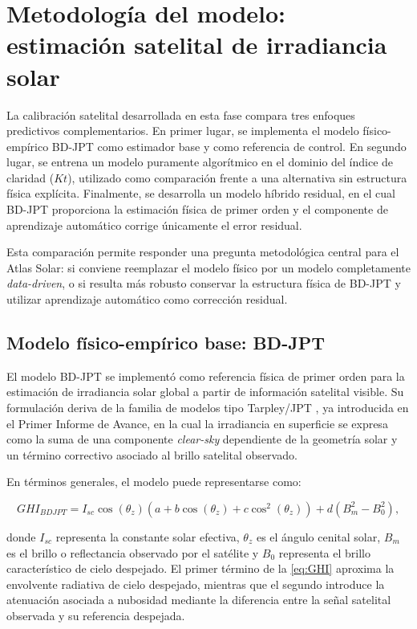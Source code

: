 \documentclass[../main.tex]{subfiles}
\begin{document}
\section{Metodología del modelo: estimación satelital de irradiancia solar}

La calibración satelital desarrollada en esta fase compara tres enfoques predictivos complementarios. En primer lugar, se implementa el modelo físico-empírico BD-JPT como estimador base y como referencia de control. En segundo lugar, se entrena un modelo puramente algorítmico en el dominio del índice de claridad ($Kt$), utilizado como comparación frente a una alternativa sin estructura física explícita. Finalmente, se desarrolla un modelo híbrido residual, en el cual BD-JPT proporciona la estimación física de primer orden y el componente de aprendizaje automático corrige únicamente el error residual.

Esta comparación permite responder una pregunta metodológica central para el Atlas Solar: si conviene reemplazar el modelo físico por un modelo completamente \textit{data-driven}, o si resulta más robusto conservar la estructura física de BD-JPT y utilizar aprendizaje automático como corrección residual.

\subsection{Modelo físico-empírico base: BD-JPT}

El modelo BD-JPT se implementó como referencia física de primer orden para la estimación de irradiancia solar global a partir de información satelital visible. Su formulación deriva de la familia de modelos tipo Tarpley/JPT \cite{tarpley1979,alonsosuarez2012}, ya introducida en el Primer Informe de Avance, en la cual la irradiancia en superficie se expresa como la suma de una componente \textit{clear-sky} dependiente de la geometría solar y un término correctivo asociado al brillo satelital observado.

En términos generales, el modelo puede representarse como:

\begin{equation}
GHI_{BDJPT} =
I_{sc} \cos(\theta_z)
\left(
a + b \cos(\theta_z) + c \cos^2(\theta_z)
\right)
+
d\left(B_m^2 - B_0^2\right),
\label{eq:GHI}
\end{equation}

donde $I_{sc}$ representa la constante solar efectiva, $\theta_z$ es el ángulo cenital solar, $B_m$ es el brillo o reflectancia observado por el satélite y $B_0$ representa el brillo característico de cielo despejado. El primer término de la \ref{eq:GHI} aproxima la envolvente radiativa de cielo despejado, mientras que el segundo introduce la atenuación asociada a nubosidad mediante la diferencia entre la señal satelital observada y su referencia despejada.
\end{document}
